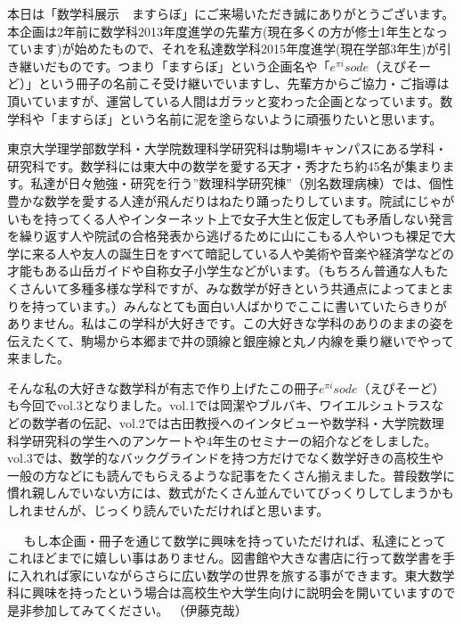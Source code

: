 本日は「数学科展示　ますらぼ」にご来場いただき誠にありがとうございます。本企画は2年前に数学科2013年度進学の先輩方(現在多くの方が修士1年生となっています)が始めたもので、それを私達数学科2015年度進学(現在学部3年生)が引き継いだものです。つまり「ますらぼ」という企画名や「$e^{\pi i}sode$（えぴそーど）」という冊子の名前こそ受け継いでいますし、先輩方からご協力・ご指導は頂いていますが、運営している人間はガラッと変わった企画となっています。数学科や「ますらぼ」という名前に泥を塗らないように頑張りたいと思います。\par
東京大学理学部数学科・大学院数理科学研究科は駒場Ⅰキャンパスにある学科・研究科です。数学科には東大中の数学を愛する天才・秀才たち約45名が集まります。私達が日々勉強・研究を行う”数理科学研究棟”（別名数理病棟）では、個性豊かな数学を愛する人達が飛んだりはねたり踊ったりしています。院試にじゃがいもを持ってくる人やインターネット上で女子大生と仮定しても矛盾しない発言を繰り返す人や院試の合格発表から逃げるために山にこもる人やいつも裸足で大学に来る人や友人の誕生日をすべて暗記している人や美術や音楽や経済学などの才能もある山岳ガイドや自称女子小学生などがいます。（もちろん普通な人もたくさんいて多種多様な学科ですが、みな数学が好きという共通点によってまとまりを持っています。）みんなとても面白い人ばかりでここに書いていたらきりがありません。私はこの学科が大好きです。この大好きな学科のありのままの姿を伝えたくて、駒場から本郷まで井の頭線と銀座線と丸ノ内線を乗り継いでやって来ました。\par
そんな私の大好きな数学科が有志で作り上げたこの冊子$e^{\pi i}sode$（えぴそーど）も今回でvol.3となりました。vol.1では岡潔やブルバキ、ワイエルシュトラスなどの数学者の伝記、vol.2では古田教授へのインタビューや数学科・大学院数理科学研究科の学生へのアンケートや4年生のセミナーの紹介などをしました。vol.3では、数学的なバックグラインドを持つ方だけでなく数学好きの高校生や一般の方などにも読んでもらえるような記事をたくさん揃えました。普段数学に慣れ親しんでいない方には、数式がたくさん並んでいてびっくりしてしまうかもしれませんが、じっくり読んでいただければと思います。\par　
もし本企画・冊子を通じて数学に興味を持っていただければ、私達にとってこれほどまでに嬉しい事はありません。図書館や大きな書店に行って数学書を手に入れれば家にいながらさらに広い数学の世界を旅する事ができます。東大数学科に興味を持ったという場合は高校生や大学生向けに説明会を開いていますので是非参加してみてください。
（伊藤克哉）
